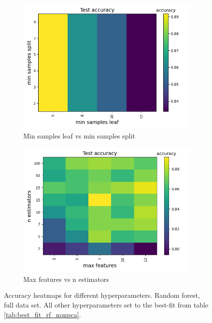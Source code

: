 \documentclass[a4paper]{article}
\begin{document}
\begin{figure}[H]
  \begin{subfigure}{0.49\textwidth}
    \includegraphics[scale=0.45]{../figures/random_forest/heatmaps/heatmap_nbins200_pca0_seed4155_ts0.20_accuracy_min_samples_leaf_min_samples_split.png}
    \caption{Min samples leaf vs min samples split}
  \end{subfigure}
  \begin{subfigure}{0.49\textwidth}
    \includegraphics[scale=0.45]{../figures/random_forest/heatmaps/heatmap_nbins200_pca0_seed4155_ts0.20_accuracy_max_features_n_estimators.png}
    \caption{Max features vs n estimators}
  \end{subfigure}
  \caption{Accuracy heatmaps for different hyperparameters. Random forest, full data set. All other hyperparameters set to the best-fit from table \ref{tab:best_fit_rf_nonpca}.}
  \label{fig:app_rf_nonpca}
\end{figure}
\end{document}
